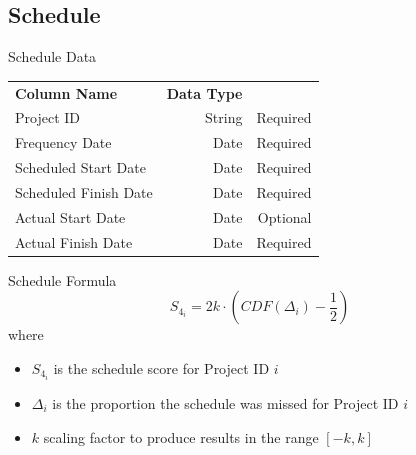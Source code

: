     \subsection{Schedule}
        \begin{frame}{Schedule Data}
            \centering
            \begin{tabular}{l | r | r}
                {\bfseries Column Name}
                 & {\bfseries Data Type}
                 &  \\
                
                Project ID & String  & Required \\
                \myrowcolour%
                Frequency Date & Date & Required \\
                Scheduled Start Date & Date & Required \\
                \myrowcolour%
                Scheduled Finish Date & Date & Required \\
                Actual Start Date & Date  & Optional \\
                \myrowcolour%
                Actual Finish Date & Date  & Required \\
            \end{tabular}
        \end{frame} 
        \begin{frame}{Schedule Formula }
            \begin{equation}
                S_{4_i} = 2k \cdot \left(CDF(\Delta_i) - \frac{1}{2} \right)
            \end{equation}
            where
            \begin{itemize}
                \item $S_{4_i}$ is the schedule score for Project ID $i$
                \item $\Delta_i$ is the proportion the schedule was missed for Project ID $i$
                \item $k$ scaling factor to produce results in the range $[-k,k]$
            \end{itemize}
        \end{frame} 
